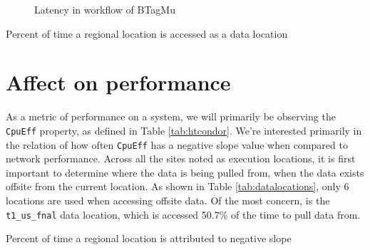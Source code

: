 \documentclass[print,ms]{nuthesis}
\begin{document}
\begin{figure}[!htb]
	\caption{Latency in workflow of BTagMu}
	\label{fig:btagmu}
	\endminipage\hfill
\end{figure}

\begin{table}
	\caption{Percent of time a regional location is accessed as a data location}
	\label{tab:datalocations}
\end{table}
\section{Affect on performance} \label{sec:performance}
As a metric of performance on a system, we will primarily be observing the \texttt{CpuEff} property, as defined in Table \ref{tab:htcondor}. We're interested primarily in the relation of how often \texttt{CpuEff} has a negative slope value when compared to network performance. Across all the sites noted as execution locations, it is first important to determine where the data is being pulled from, when the data exists offsite from the current location. As shown in Table \ref{tab:datalocations}, only 6 locations are used when accessing offsite data. Of the most concern, is the \texttt{t1\_us\_fnal} data location, which is accessed 50.7\% of the time to pull data from.
\begin{table}
	\caption{Percent of time a regional location is attributed to negative slope}
	\label{tab:badop}
\end{table}
\end{document}
